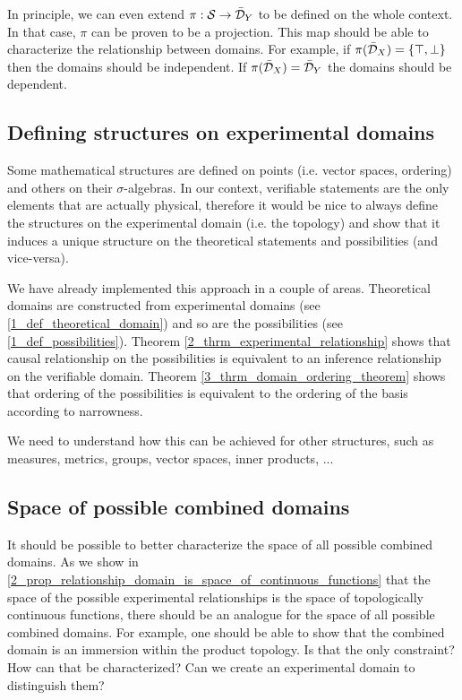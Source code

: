 \documentclass[11pt,letterpaper,fleqn]{memoir} %
\begin{document}
In principle, we can even extend $\pi : \mathcal{S} \to \bar{\mathcal{D}}_Y$ to be defined on the whole context. In that case, $\pi$ can be proven to be a projection. This map should be able to characterize the relationship between domains. For example, if $\pi(\bar{\mathcal{D}}_X) = \{ \top, \bot \}$ then the domains should be independent. If $\pi(\bar{\mathcal{D}}_X) = \bar{\mathcal{D}}_Y$ the domains should be dependent.

\subsection{Defining structures on experimental domains}

Some mathematical structures are defined on points (i.e. vector spaces, ordering) and others on their $\sigma$-algebras. In our context, verifiable statements are the only elements that are actually physical, therefore it would be nice to always define the structures on the experimental domain (i.e. the topology) and show that it induces a unique structure on the theoretical statements and possibilities (and vice-versa).

We have already implemented this approach in a couple of areas. Theoretical domains are constructed from experimental domains (see \ref{1_def_theoretical_domain}) and so are the possibilities (see \ref{1_def_possibilities}). Theorem \ref{2_thrm_experimental_relationship} shows that causal relationship on the possibilities is equivalent to an inference relationship on the verifiable domain. Theorem \ref{3_thrm_domain_ordering_theorem} shows that ordering of the possibilities is equivalent to the ordering of the basis according to narrowness.

We need to understand how this can be achieved for other structures, such as measures, metrics, groups, vector spaces, inner products, ...

\subsection{Space of possible combined domains}

It should be possible to better characterize the space of all possible combined domains. As we show in \ref{2_prop_relationship_domain_is_space_of_continuous_functions} that the space of the possible experimental relationships is the space of topologically continuous functions, there should be an analogue for the space of all possible combined domains. For example, one should be able to show that the combined domain is an immersion within the product topology. Is that the only constraint? How can that be characterized? Can we create an experimental domain to distinguish them?
\end{document}
